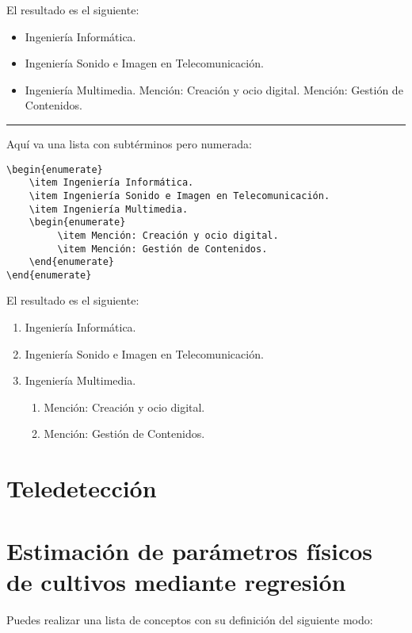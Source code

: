 El resultado es el siguiente:
\begin{itemize}
    \item Ingeniería Informática.
    \item Ingeniería Sonido e Imagen en Telecomunicación.
    \item Ingeniería Multimedia.
         \subitem Mención: Creación y ocio digital.
         \subitem Mención: Gestión de Contenidos.
\end{itemize}
\vspace{1em}
\noindent\hrule
\vspace{1em}
Aquí va una lista con subtérminos pero numerada:
\begin{lstlisting}[style=Latex-color]
\begin{enumerate}
    \item Ingeniería Informática.
    \item Ingeniería Sonido e Imagen en Telecomunicación.
    \item Ingeniería Multimedia.
    \begin{enumerate}
         \item Mención: Creación y ocio digital.
         \item Mención: Gestión de Contenidos.
   	\end{enumerate}
\end{enumerate}
\end{lstlisting}

El resultado es el siguiente:
\begin{enumerate}
    \item Ingeniería Informática.
    \item Ingeniería Sonido e Imagen en Telecomunicación.
    \item Ingeniería Multimedia.
    \begin{enumerate}
         \item Mención: Creación y ocio digital.
         \item Mención: Gestión de Contenidos.
   	\end{enumerate}
\end{enumerate}

\section{Teledetección}
\section{Estimación de parámetros físicos de cultivos mediante regresión}
 Puedes realizar una lista de conceptos con su definición del siguiente modo:
 
